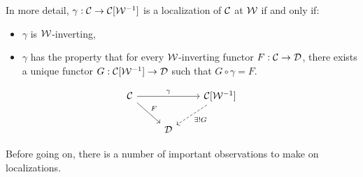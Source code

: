 In more detail, $\gamma:\mathcal{C}\to\mathcal{C}[\mathcal{W}^{-1}]$ is a localization of $\mathcal{C}$ at $\mathcal{W}$ if and only if:
\begin{itemize}[label={-}]
    \item $\gamma$ is $\mathcal{W}$-inverting,
    \item $\gamma$ has the property that for every $\mathcal{W}$-inverting functor $F:\mathcal{C}\to\mathcal{D}$, there exists a unique functor $G:\mathcal{C}[\mathcal{W}^{-1}]\to\mathcal{D}$ such that $G\circ\gamma=F$.
\end{itemize}
\[
\begin{tikzcd}
\Cc \ar[dr,"F"] \ar[rr,"\gamma"] & & {\Cc[\Ww^\inv]} \ar[dl,dashed,"\exists! G"]\\
& \Dd &
\end{tikzcd}
\]

Before going on, there is a number of important observations to make on localizations.

